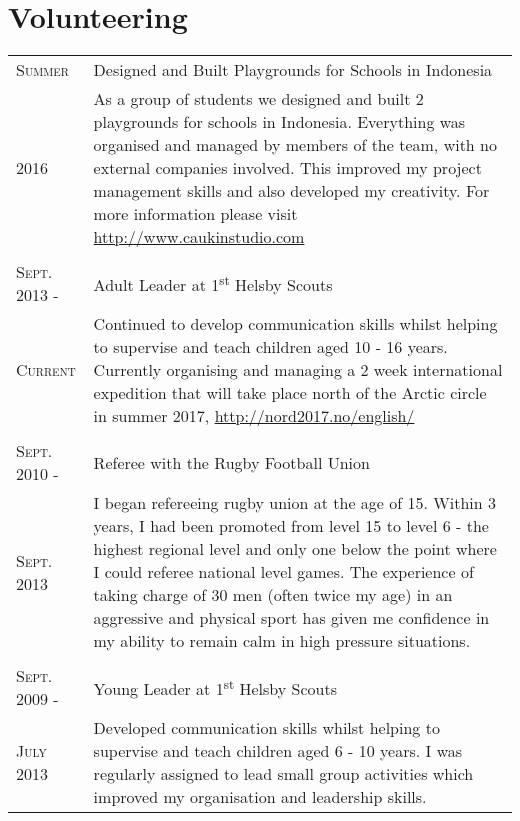 \documentclass[a4paper]{article}
\begin{document}
\section{Volunteering}
\begin{tabularx}{\textwidth}{lX}
\textsc{Summer} & Designed and Built Playgrounds for Schools in Indonesia\\
\textsc{2016} & \footnotesize{As a group of students we designed and built 2 playgrounds for schools in Indonesia. Everything was organised and managed by members of the team, with no external companies involved. This improved my project management skills and also developed my creativity. For more information please visit \url{http://www.caukinstudio.com}}
\\
\\
\textsc{Sept. 2013 -} & Adult Leader at 1\textsuperscript{st} Helsby Scouts\\
\textsc{Current} & \footnotesize{Continued to develop communication skills whilst helping to supervise and teach children aged 10 - 16 years.
Currently organising and managing a 2 week international expedition that will take place north of the Arctic circle in summer 2017, \url{http://nord2017.no/english/}}
\\
\\
\textsc{Sept. 2010 -} & Referee with the Rugby Football Union \\
\textsc{Sept. 2013} & \footnotesize{I began refereeing rugby union at the age of 15. Within 3 years, I had been promoted from level 15 to level 6 - the highest regional level and only one below the point where I could referee national level games.
The experience of taking charge of 30 men (often twice my age) in an aggressive and physical sport has given me confidence in my ability to remain calm in high pressure situations.}
\\
\\
\textsc{Sept. 2009 -} & Young Leader at 1\textsuperscript{st} Helsby Scouts\\
\textsc{July 2013} & \footnotesize{Developed communication skills whilst helping to supervise and teach children aged 6 - 10 years.
I was regularly assigned to lead small group activities which improved my organisation and leadership skills.}\\
\end{tabularx}
\end{document}
